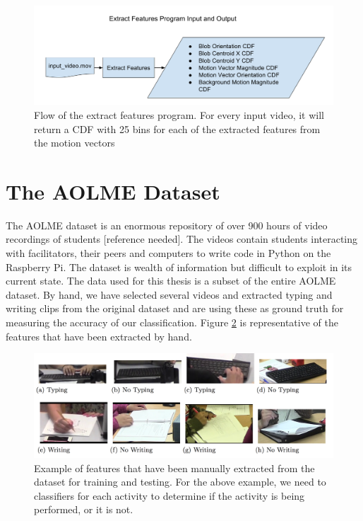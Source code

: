 \begin{figure}[h]
  \label{fig:extract_flow}
  \centering
  \includegraphics[width=14cm]{figures/extract_features_flow}
  \caption{Flow of the extract features program. For every input video, it will
  return a CDF with 25 bins for each of the extracted features from the motion
  vectors}
\end{figure}

\section{\label{section:the_data}The AOLME Dataset}
The AOLME dataset is an enormous repository of over 900 hours of video
recordings of students [reference needed]. The videos contain students
interacting with facilitators, their peers and computers to write code in
Python on the Raspberry Pi.  The dataset is wealth of information but difficult
to exploit in its current state.  The data used for this thesis is a subset of
the entire AOLME dataset. By hand, we have selected several videos and extracted
typing and writing clips from the original dataset and are using these as ground
truth for measuring the accuracy of our classification. Figure \ref{fig:typing_writing}
is representative of the features that have been extracted by hand.

\begin{figure}[h]
  \label{fig:typing_writing}
  \centering
  \includegraphics[width=\textwidth]{figures/typing_writing_clip}
  \caption{Example of features that have been manually extracted from the dataset
  for training and testing. For the above example, we need to classifiers for each
  activity to determine if the activity is being performed, or it is not.}
\end{figure}

